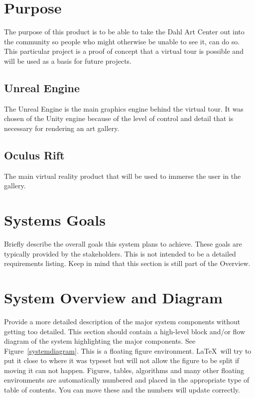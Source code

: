 \section{Purpose}
The purpose of this product is to be able to take the Dahl Art Center out into the community so people who might otherwise be unable to see it, can do so.  This particular project is a proof of concept that a virtual tour is possible and will be used as a basis for future projects.


\subsection{Unreal Engine}
The Unreal Engine is the main graphics engine behind the virtual tour.  It was chosen of the Unity engine because of the level of control and detail that is necessary for rendering an art gallery. 

\subsection{Oculus Rift}
The main virtual reality product that will be used to immerse the user in the gallery.

\section{Systems Goals}
Briefly describe the overall goals this system plans to achieve.
These goals are typically provided by the stakeholders.  This is not
intended to be a detailed requirements listing.  Keep in mind that
this section is still part of the Overview.

\section{System Overview and Diagram}
Provide a more detailed description of the major system components
without getting too detailed.  This section should contain a
high-level block and/or flow diagram of the system highlighting the
major components.  See Figure~\ref{systemdiagram}.  This is a floating
figure environment.  \LaTeX\ will try to put it close to where it was
typeset but will not allow the figure to be split if moving it can not
happen.  Figures, tables, algorithms and many other floating
environments are automatically numbered and placed in the appropriate
type of table of contents.  You can move these and the numbers will
update correctly.


